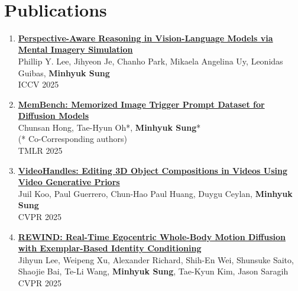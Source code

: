 \documentclass[letterpaper,10pt]{article} %
\newcommand{\blankline}{\quad\pagebreak[2]}
\begin{document}
{{\begin{tabular}{r|p{14cm}}
\end{tabular}\\

\blankline



\section{Publications}

\begin{enumerate}

\item \label{iccv25}
\href{https://arxiv.org/abs/2504.17207}{\textbf{Perspective-Aware Reasoning in Vision-Language Models via Mental Imagery Simulation}}\\
Phillip Y. Lee, Jihyeon Je, Chanho Park, Mikaela Angelina Uy, Leonidas Guibas, \textbf{Minhyuk Sung}\\
ICCV 2025\\
\blankline

\item \label{tmlr25}
\href{https://arxiv.org/abs/2407.17095}{\textbf{MemBench: Memorized Image Trigger Prompt Dataset for Diffusion Models}}\\
Chunsan Hong, Tae-Hyun Oh*, \textbf{Minhyuk Sung}*\\
(* Co-Corresponding authors)\\
TMLR 2025\\
\blankline

\item \label{cvpr25}
\href{https://www.arxiv.org/abs/2503.01107}{\textbf{VideoHandles: Editing 3D Object Compositions in Videos Using Video Generative Priors}}\\
Juil Koo, Paul Guerrero, Chun-Hao Paul Huang, Duygu Ceylan, \textbf{Minhyuk Sung}\\
CVPR 2025\\
\blankline

\item \label{cvpr25}
\href{https://arxiv.org/abs/2504.04956}{\textbf{REWIND: Real-Time Egocentric Whole-Body Motion Diffusion with Exemplar-Based Identity Conditioning}}\\
Jihyun Lee, Weipeng Xu, Alexander Richard, Shih-En Wei, Shunsuke Saito, Shaojie Bai, Te-Li Wang, \textbf{Minhyuk Sung}, Tae-Kyun Kim, Jason Saragih\\
CVPR 2025\\
\blankline


\end{enumerate}}}
\end{document}
